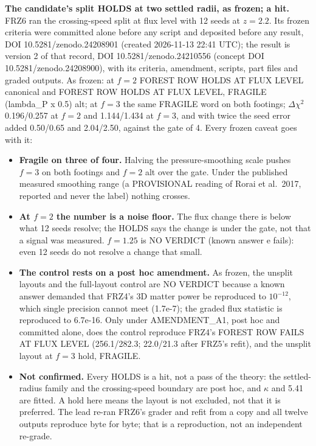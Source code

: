 \documentclass[10pt]{article}
\begin{document}
\textbf{The candidate's split HOLDS at two settled radii, as frozen; a hit.} FRZ6 ran the crossing-speed split at flux level with 12 seeds at $z=2.2$. Its frozen criteria were committed alone before any script and deposited before any result, DOI 10.5281/zenodo.24208901 (created 2026-11-13 22:41 UTC); the result is version 2 of that record, DOI 10.5281/zenodo.24210556 (concept DOI 10.5281/zenodo.24208900), with its criteria, amendment, scripts, part files and graded outputs. As frozen: at $f=2$ FOREST ROW HOLDS AT FLUX LEVEL canonical and FOREST ROW HOLDS AT FLUX LEVEL, FRAGILE (lambda\_P x 0.5) alt; at $f=3$ the same FRAGILE word on both footings; $\Delta\chi^2$ 0.196/0.257 at $f=2$ and 1.144/1.434 at $f=3$, and with twice the seed error added 0.50/0.65 and 2.04/2.50, against the gate of 4. Every frozen caveat goes with it:
\begin{itemize}
\item \textbf{Fragile on three of four.} Halving the pressure-smoothing scale pushes $f=3$ on both footings and $f=2$ alt over the gate. Under the published measured smoothing range (a PROVISIONAL reading of Rorai et al.\ 2017, reported and never the label) nothing crosses.
\item \textbf{At $f=2$ the number is a noise floor.} The flux change there is below what 12 seeds resolve; the HOLDS says the change is under the gate, not that a signal was measured. $f=1.25$ is NO VERDICT (known answer e fails): even 12 seeds do not resolve a change that small.
\item \textbf{The control rests on a post hoc amendment.} As frozen, the unsplit layouts and the full-layout control are NO VERDICT because a known answer demanded that FRZ4's 3D matter power be reproduced to $10^{-12}$, which single precision cannot meet (1.7e-7); the graded flux statistic is reproduced to 6.7e-16. Only under AMENDMENT\_A1, post hoc and committed alone, does the control reproduce FRZ4's FOREST ROW FAILS AT FLUX LEVEL (256.1/282.3; 22.0/21.3 after FRZ5's refit), and the unsplit layout at $f=3$ hold, FRAGILE.
\item \textbf{Not confirmed.} Every HOLDS is a hit, not a pass of the theory: the settled-radius family and the crossing-speed boundary are post hoc, and $\kappa$ and 5.41 are fitted. A hold here means the layout is not excluded, not that it is preferred. The lead re-ran FRZ6's grader and refit from a copy and all twelve outputs reproduce byte for byte; that is a reproduction, not an independent re-grade.
\end{itemize}
\end{document}
